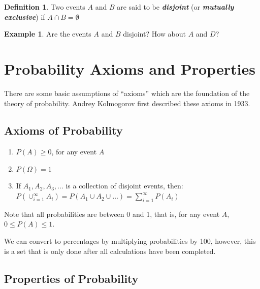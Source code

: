 \documentclass[
  11pt,
]{book}
\providecommand{\tightlist}{%
  \setlength{\itemsep}{0pt}\setlength{\parskip}{0pt}}
\theoremstyle{definition}
\newtheorem{definition}{Definition}[chapter]
\theoremstyle{definition}
\newtheorem{example}{Example}[chapter]
\theoremstyle{definition}
\theoremstyle{definition}
\theoremstyle{remark}
\begin{document}
\begin{definition}
Two events \(A\) and \(B\) are said to be \textbf{\emph{disjoint}} (or \textbf{\emph{mutually exclusive}}) if \(A \cap B = \emptyset\)
\end{definition}

\begin{example}
Are the events \(A\) and \(B\) disjoint? How about \(A\) and \(D\)?
\end{example}

\hfill\break
\hfill\break
\hfill\break
\hfill\break
\hfill\break

\hypertarget{probability-axioms-and-properties}{%
\section{Probability Axioms and Properties}\label{probability-axioms-and-properties}}

There are some basic assumptions of ``axioms'' which are the foundation of the theory of probability. Andrey Kolmogorov first described these axioms in 1933.

\hypertarget{axioms-of-probability}{%
\subsection{Axioms of Probability}\label{axioms-of-probability}}

\begin{enumerate}
\def\labelenumi{\arabic{enumi}.}
\tightlist
\item
  \(P(A) \geq 0\), for any event \(A\)\\
\item
  \(P(\Omega) = 1\)\\
\item
  If \(A_1, A_2, A_3, \ldots\) is a collection of disjoint events, then:\\
  \(P(\cup_{i=1}^{\infty} A_i) = P(A_1 \cup A_2 \cup \ldots ) = \sum_{i=1}^{\infty} P(A_i)\)
\end{enumerate}

Note that all probabilities are between 0 and 1, that is, for any event \(A\), \(0 \leq P(A) \leq 1\).

We can convert to percentages by multiplying probabilities by 100, however, this is a set that is only done after all calculations have been completed.

\hypertarget{properties-of-probability}{%
\subsection{Properties of Probability}\label{properties-of-probability}}
\end{document}
